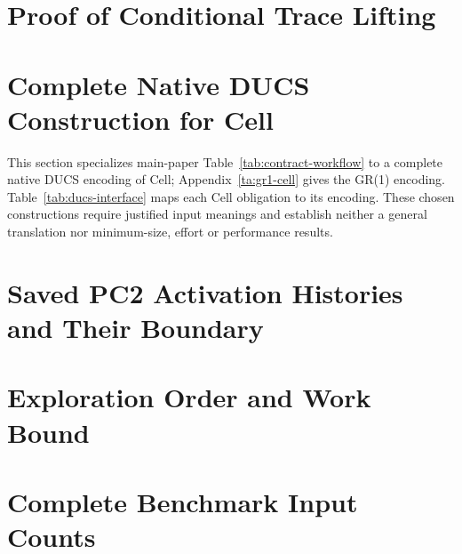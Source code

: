 \documentclass[11pt]{article}
\begin{document}
\section{Proof of Conditional Trace Lifting}\label{ta:execution_proof}


\FloatBarrier


\FloatBarrier
\section{Complete Native DUCS Construction for Cell}
\label{ta:ducs_cell_complete}\label{ta:ducs_interface}
This section specializes main-paper Table~\ref{tab:contract-workflow} to a complete native DUCS encoding of Cell; Appendix~\ref{ta:gr1-cell} gives the GR(1) encoding. Table~\ref{tab:ducs-interface} maps each Cell obligation to its encoding. These chosen constructions require justified input meanings and establish neither a general translation nor minimum-size, effort or performance results.



\FloatBarrier

\FloatBarrier
\section{Saved PC2 Activation Histories and Their Boundary}
\label{ta:pc2_history_boundary}







\FloatBarrier
\section{Exploration Order and Work Bound}\label{ta:exploration_order}


\FloatBarrier

\FloatBarrier
{}
\section{Complete Benchmark Input Counts}\label{ta:benchmark_inputs}

\FloatBarrier
\end{document}

